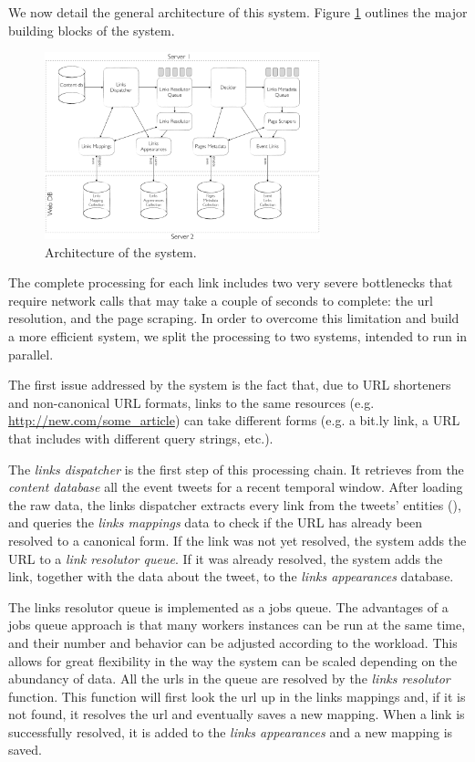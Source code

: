 \documentclass{sig-alternate}
\begin{document}
We now detail the general architecture of this system. Figure \ref{fig:architecture} outlines the major building blocks of the system.
\begin{figure}[htbp]
  \centering
  \includegraphics[width=8cm]{Figures/links_processing_architecture.png}
  \caption{Architecture of the system.}
  \label{fig:architecture}
\end{figure}

The complete processing for each link includes two very severe bottlenecks that require network calls that may take a couple of seconds to complete: the url resolution, and the page scraping. In order to overcome this limitation and build a more efficient system, we split the processing to two systems, intended to run in parallel.

The first issue addressed by the system is the fact that, due to URL shorteners and non-canonical URL formats, links to the same resources (e.g. \url{http://new.com/some\_article}) can take different forms (e.g. a bit.ly link, a URL that includes with different query strings, etc.).

The \emph{links dispatcher} is the first step of this processing chain. It retrieves from the \emph{content database} all the event tweets for a recent temporal window. After loading the raw data, the links dispatcher extracts every link from the tweets' entities (\cite{RestTweetsDoc}), and queries the \emph{links mappings} data to check if the URL has already been resolved to a canonical form. If the link was not yet resolved, the system adds the URL to a \emph{link resolutor queue}. If it was already resolved, the system adds the link, together with the data about the tweet, to the \emph{links appearances} database.

The links resolutor queue is implemented as a jobs queue\cite{RedisQueues}. The advantages of a jobs queue approach is that many workers instances can be run at the same time, and their number and behavior can be adjusted according to the workload. This allows for great flexibility in the way the system can be scaled depending on the abundancy of data.
All the urls in the queue are resolved by the \emph{links resolutor} function. This function will first look the url up in the links mappings and, if it is not found, it resolves the url and eventually saves a new mapping. When a link is successfully resolved, it is added to the \emph{links appearances} and a new mapping is saved.
\end{document}
